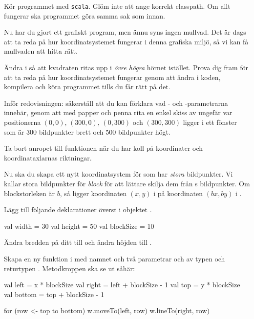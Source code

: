 \Subtask
Kör programmet  med \texttt{scala}.
Glöm inte att ange korrekt classpath.
Om allt fungerar ska programmet göra samma sak som innan.

\Task
Nu har du gjort ett grafiskt program, men ännu syns ingen mullvad.
Det är dags att ta reda på hur koordinatsystemet fungerar i denna grafiska miljö, så vi kan få mullvaden att hitta rätt.

\Subtask
Ändra i  så att kvadraten ritas upp i \emph{övre högra} hörnet istället.
Prova dig fram för att ta reda på hur koordinatsystemet fungerar genom att ändra i koden, kompilera och köra programmet tills du får rätt på det.

\Subtask\Pen
Inför redovisningen: säkerställ att du kan förklara vad - och -parametrarna innebär, genom att med papper och penna rita en enkel skiss av ungefär var positionerna $(0,0)$, $(300, 0)$, $(0, 300)$ och $(300, 300)$ ligger i ett fönster som är 300 bildpunkter  brett och 500 bildpunkter högt.

\Subtask
Ta bort anropet till funktionen  när du har koll på koordinater och koordinataxlarnas riktningar.  %

\Task
Nu ska du skapa ett nytt koordinatsystem för  som har \emph{stora} bildpunkter.
Vi kallar  stora bildpunkter för \emph{block} för att lättare skilja dem från s bildpunkter.
Om blockstorleken är $b$, så ligger koordinaten $(x, y)$ i  på koordinaten $(bx, by)$ i .

\Subtask
Lägg till följande deklarationer överst i objektet .
\begin{Code}
val width = 30
val height = 50
val blockSize = 10
\end{Code}

\Subtask
Ändra bredden på ditt  till  och ändra höjden till .

\Subtask
Skapa en ny funktion i  med namnet  och två parametrar  och  av typen  och returtypen .
Metodkroppen ska se ut såhär:
\begin{Code}
{
    val left = x * blockSize
    val right = left + blockSize - 1
    val top = y * blockSize
    val bottom = top + blockSize - 1

    for (row <- top to bottom) {
      w.moveTo(left, row)
      w.lineTo(right, row)
    }
}
\end{Code}

